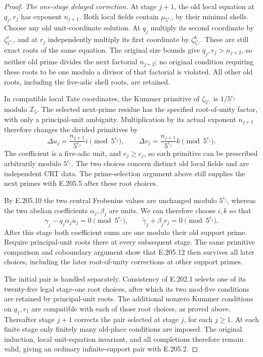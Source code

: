 \begin{proof}
\emph{The one-stage delayed correction.}
At stage $j+1$, the old local equation at $q_j,r_j$ has
exponent $n_{j+1}$.  Both local fields contain
$\mu_{5^{e_j}}$, by their minimal shells.  Choose any old
unit-coordinate solution.  At $q_j$ multiply its second
coordinate by $\zeta_{5^{e_j}}^i$, and at $r_j$
independently multiply its first coordinate by
$\zeta_{5^{e_j}}^k$.  These are still exact roots of the
same equation.  The original size bounds give
$q_j,r_j>n_{j+2}$, so neither old prime divides the next
factorial $n_{j+2}$; no original condition requiring these
roots to be one modulo a divisor of that factorial is
violated.  All other old roots, including the five-adic
shell roots, are retained.

In compatible local Tate coordinates, the Kummer primitive
of $\zeta_{5^{e_j}}$ is $1/5^{e_j}$ modulo
$\mathbb Z_5$.  The selected next-prime residue has the
specified root-of-unity factor, with only a principal-unit
ambiguity.  Multiplication by its actual exponent
$n_{j+1}$ therefore changes the divided primitives by
\[
 \Delta u_j=\frac{n_{j+1}}{5^{e_j}}i
                  \pmod{5^{c_j}},\qquad
 \Delta v_j=\frac{n_{j+1}}{5^{e_j}}k
                  \pmod{5^{c_j}}.
 \tag{E.205.11}
\]
The coefficient is a five-adic unit, and $e_j\geq c_j$,
so each primitive can be prescribed arbitrarily modulo
$5^{c_j}$.  The two choices concern distinct old local
fields and are independent CRT data.  The prime-selection
argument above still supplies the next primes with
E.205.5 after these root choices.

By E.205.10 the two central Frobenius values are unchanged
modulo $5^{c_j}$, whereas the two abelian coefficients
$\alpha_j,\beta_j$ are units.  We can therefore choose
$i,k$ so that
\[
 \gamma_j-q_j\alpha_j u_j=0\pmod{5^{c_j}},\qquad
 \widetilde\gamma_j+\beta_jv_j=0\pmod{5^{c_j}}.
 \tag{E.205.12}
\]
After this stage both coefficient sums are one modulo
their old support prime.  Require principal-unit roots
there at every subsequent stage.  The same primitive
comparison and coboundary argument show that E.205.12
then survives all later choices, including the later
root-of-unity corrections at other support primes.

The initial pair is handled separately.  Consistency of
E.202.1 selects one of its twenty-five legal stage-one
root choices, after which its two mod-five conditions
are retained by principal-unit roots.  The additional
nonzero Kummer conditions on $q_1,r_1$ are compatible
with each of those root choices, as proved above.
Thereafter stage $j+1$ corrects the pair selected at
stage $j$, for each $j\geq1$.  At each finite stage
only finitely many old-place conditions are imposed.
The original induction, local unit-equation invariant,
and all completions therefore remain valid, giving an
ordinary infinite-support pair with E.205.2.


\end{proof}

